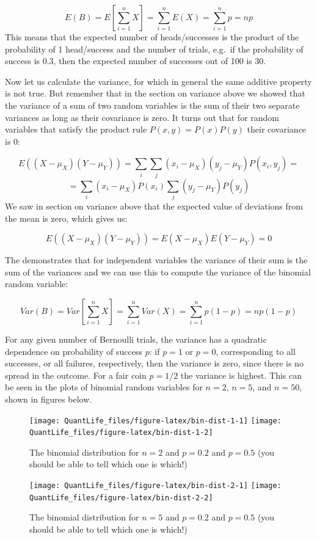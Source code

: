 \documentclass[
]{book}
\theoremstyle{definition}
\theoremstyle{definition}
\theoremstyle{definition}
\theoremstyle{remark}
\begin{document}
\[
E(B) = E\left[\sum_{i=1}^n X\right] = \sum_{i=1}^n E(X) = \sum_{i=1}^n p = np 
\]
This means that the expected number of heads/successes is the product of the probability of 1 head/success and the number of trials, e.g.~if the probability of success is 0.3, then the expected number of successes out of 100 is 30.

Now let us calculate the variance, for which in general the same additive property is not true. But remember that in the section on variance above we showed that the variance of a sum of two random variables is the sum of their two separate variances as long as their covariance is zero. It turns out that for random variables that satisfy the product rule \(P(x, y) = P(x)P(y)\) their covariance is 0:

\[E((X-\mu_X)(Y-\mu_Y))  =  \sum_i \sum_j (x_i-\mu_X) (y_j-\mu_Y) P(x_i, y_j) =  \]
\[ = \sum_i(x_i-\mu_X)P(x_i) \sum_j (y_j-\mu_Y) P(y_j) \]
We saw in section on variance above that the expected value of deviations from the mean is zero, which gives us:

\[E((X-\mu_X)(Y-\mu_Y))  = E(X-\mu_X)E(Y-\mu_Y) = 0\]

The demonstrates that for independent variables the variance of their sum is the sum of the variances and we can use this to compute the variance of the binomial random variable:

\[
Var(B) = Var\left[\sum_{i=1}^n X\right]  = \sum_{i=1}^n Var(X) =\sum_{i=1}^n p(1-p) = np(1-p)
\]

For any given number of Bernoulli trials, the variance has a quadratic dependence on probability of success \(p\): if \(p=1\) or \(p=0\), corresponding to all successes, or all failures, respectively, then the variance is zero, since there is no spread in the outcome. For a fair coin \(p=1/2\) the variance is highest. This can be seen in the plots of binomial random variables for \(n=2\), \(n=5\), and \(n=50\), shown in figures below.

\begin{figure}

{\centering \texttt{[image: QuantLife\_files/figure-latex/bin-dist-1-1]} \texttt{[image: QuantLife\_files/figure-latex/bin-dist-1-2]} 

}

\caption{The binomial distribution for $n=2$ and $p=0.2$ and $p=0.5$ (you should be able to tell which one is which!)}\label{fig:bin-dist-1}
\end{figure}

\begin{figure}

{\centering \texttt{[image: QuantLife\_files/figure-latex/bin-dist-2-1]} \texttt{[image: QuantLife\_files/figure-latex/bin-dist-2-2]} 

}

\caption{The binomial distribution for $n=5$ and $p=0.2$ and $p=0.5$ (you should be able to tell which one is which!)}\label{fig:bin-dist-2}
\end{figure}
\end{document}
